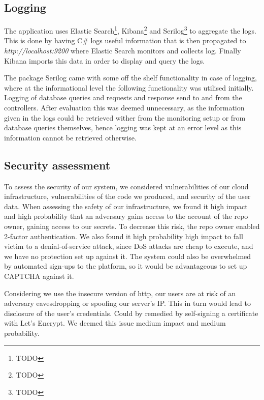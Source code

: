 \documentclass[report/main.tex]{subfiles}
\begin{document}
        \subsection{Logging}
            \label{SubSec:logging}
            The application uses Elastic Search\footnote{TODO}, Kibana\footnote{TODO} and Serilog\footnote{TODO} to aggregate the logs. This is done by having C\# logs useful information that is then propagated to \textit{http://localhost:9200} where Elastic Search monitors and collects log. Finally Kibana imports this data in order to display and query the logs.
            
            The package Serilog came with some off the shelf functionality in case of logging, where at the informational level the following functionality was utilised initially. Logging of database queries and requests and response send to and from the controllers. After evaluation this was deemed unnecessary, as the information given in the logs could be retrieved wither from the monitoring setup or from database queries themselves, hence logging was kept at an error level as this information cannot be retrieved otherwise.

        \subsection{Security assessment}
        To assess the security of our system, we considered vulnerabilities of our cloud infrastructure, vulnerabilities of the code we produced, and security of the user data.
        When assessing the safety of our infrastructure, we found it high impact and high probability that an adversary gains access to the account of the repo owner, gaining access to our secrets. To decrease this risk, the repo owner enabled 2-factor authentication. We also found it high probability high impact to fall victim to a denial-of-service attack, since DoS attacks are cheap to execute, and we have no protection set up against it. The system could also be overwhelmed by automated sign-ups to the platform, so it would be advantageous to set up CAPTCHA against it.
        
        Considering we use the insecure version of http, our users are at risk of an adversary eavesdropping or spoofing our server's IP. This in turn would lead to disclosure of the user's credentials. Could by remedied by self-signing a certificate with Let's Encrypt. We deemed this issue medium impact and medium probability.
        
\end{document}
